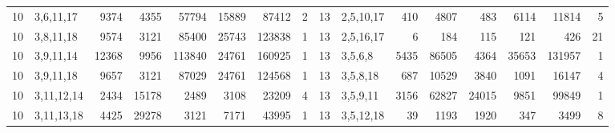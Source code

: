 \begin{table}[tp]
\begin{ruledtabular}
\begin{tabular}{rlrrrrrr@{\hspace{2.2em}}rlrrrrrr}
10 & 3,6,11,17 & 9374 & 4355 & 57794 & 15889 & 87412 & 2 & 13 & 2,5,10,17 & 410 & 4807 & 483 & 6114 & 11814 & 5 \\
10 & 3,8,11,18 & 9574 & 3121 & 85400 & 25743 & 123838 & 1 & 13 & 2,5,16,17 & 6 & 184 & 115 & 121 & 426 & 21 \\
10 & 3,9,11,14 & 12368 & 9956 & 113840 & 24761 & 160925 & 1 & 13 & 3,5,6,8 & 5435 & 86505 & 4364 & 35653 & 131957 & 1 \\
10 & 3,9,11,18 & 9657 & 3121 & 87029 & 24761 & 124568 & 1 & 13 & 3,5,8,18 & 687 & 10529 & 3840 & 1091 & 16147 & 4 \\
10 & 3,11,12,14 & 2434 & 15178 & 2489 & 3108 & 23209 & 4 & 13 & 3,5,9,11 & 3156 & 62827 & 24015 & 9851 & 99849 & 1 \\
10 & 3,11,13,18 & 4425 & 29278 & 3121 & 7171 & 43995 & 1 & 13 & 3,5,12,18 & 39 & 1193 & 1920 & 347 & 3499 & 8 \\
\end{tabular}
\end{ruledtabular}
\end{table}

